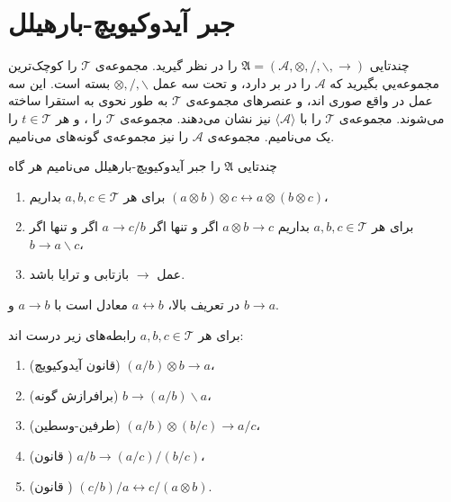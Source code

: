 \section{جبر آیدوکیویچ-بارهیلل}

چندتایی 
$\mathfrak{A} = (\mathcal{A}, \otimes, /, \backslash, \rightarrow)$
را در نظر گیرید. مجموعه‌ی 
$\mathcal{T}$
را کوچک‌ترین مجموعه‌یي بگیرید که 
$\mathcal{A}$
را در بر دارد، و تحت سه عمل 
$\otimes, /, \backslash$
بسته است. این سه عمل در واقع صوری اند، و عنصرهای مجموعه‌ی
$\mathcal{T}$
به طور نحوی به استقرا ساخته می‌شوند.
مجموعه‌ی 
$\mathcal{T}$
را با
$\langle \mathcal{A} \rangle$
نیز نشان می‌دهند.
مجموعه‌ی
$\mathcal{T}$
را ، و هر 
$t \in \mathcal{T}$
را یک  می‌نامیم.
مجموعه‌ی
$\mathcal{A}$
را نیز مجموعه‌ی گونه‌های  می‌نامیم.

\begin{definition}
چندتایی
$\mathfrak{A}$
را جبر آیدوکیویچ-بارهیلل می‌نامیم هر گاه

\begin{enumerate}
\item
برای هر
$a, b, c \in \mathcal{T}$
بداریم
$(a \otimes b) \otimes c \leftrightarrow a \otimes (b \otimes c)$،

\item 
برای هر
$a, b, c \in \mathcal{T}$
بداریم
$a \otimes b \rightarrow c$
اگر و تنها اگر
$a \rightarrow c/b$
اگر و تنها اگر
$b \rightarrow a \backslash c$،
\item
عمل 
$\rightarrow$
بازتابی و ترایا باشد.
\end{enumerate}
\end{definition}

در تعریف بالا،
$a \leftrightarrow b$
معادل است با
$a \rightarrow b$
و
$b \rightarrow a$.

\begin{theorem}
\label{theorem:1-1}
برای هر
$a, b, c \in \mathcal{T}$
رابطه‌های زیر درست اند:
\begin{enumerate}
\item
(قانون آیدوکیویچ)
$(a / b) \otimes b \rightarrow a$،
\item 
(برافرازش گونه)
$b \rightarrow (a / b) \backslash a$،
\item
(طرفین-وسطین)
$(a / b) \otimes (b / c) \rightarrow a / c$،
\item
(قانون )
$a / b \rightarrow (a / c) / (b / c)$،
\item
(قانون )
$(c / b) / a \leftrightarrow c / (a \otimes b)$.
\end{enumerate}
\end{theorem}

